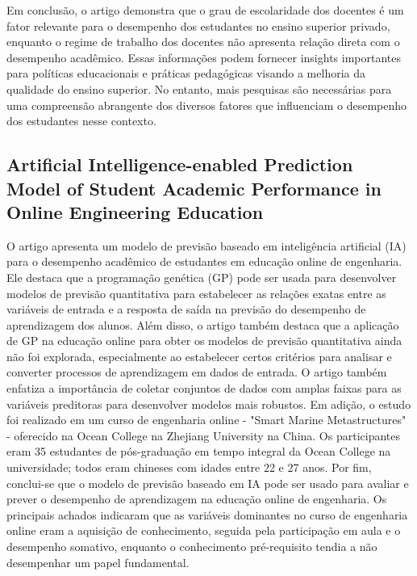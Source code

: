 \documentclass[conference]{IEEEtran}
\begin{document}
Em conclusão, o artigo demonstra que o grau de escolaridade dos docentes é um fator relevante para o desempenho dos estudantes no ensino superior privado, enquanto o regime de trabalho dos docentes não apresenta relação direta com o desempenho acadêmico. Essas informações podem fornecer insights importantes para políticas educacionais e práticas pedagógicas visando a melhoria da qualidade do ensino superior. No entanto, mais pesquisas são necessárias para uma compreensão abrangente dos diversos fatores que influenciam o desempenho dos estudantes nesse contexto.


\subsection{Artificial Intelligence-enabled Prediction Model of Student Academic Performance in Online Engineering Education\cite{b6}}
O artigo apresenta um modelo de previsão baseado em inteligência artificial (IA) para o desempenho acadêmico de estudantes em educação online de engenharia.
Ele destaca que a programação genética (GP) pode ser usada para desenvolver modelos de previsão quantitativa para estabelecer as relações exatas entre as variáveis de entrada e a resposta de saída na previsão do desempenho de aprendizagem dos alunos.
Além disso, o artigo também destaca que a aplicação de GP na educação online para obter os modelos de previsão quantitativa ainda não foi explorada, especialmente ao estabelecer certos critérios para analisar e converter processos de aprendizagem em dados de entrada. O artigo também enfatiza a importância de coletar conjuntos de dados com amplas faixas para as variáveis preditoras para desenvolver modelos mais robustos.
Em adição, o estudo foi realizado em um curso de engenharia online - "Smart Marine Metastructures" - oferecido na Ocean College na Zhejiang University na China. Os participantes eram 35 estudantes de pós-graduação em tempo integral da Ocean College na universidade; todos eram chineses com idades entre 22 e 27 anos.
Por fim, conclui-se que o modelo de previsão baseado em IA pode ser usado para avaliar e prever o desempenho de aprendizagem na educação online de engenharia. Os principais achados indicaram que as variáveis dominantes no curso de engenharia online eram a aquisição de conhecimento, seguida pela participação em aula e o desempenho somativo, enquanto o conhecimento pré-requisito tendia a não desempenhar um papel fundamental.
\end{document}
